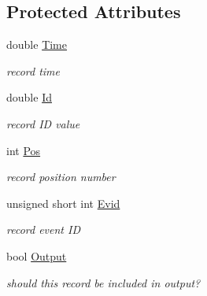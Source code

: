 \subsection*{Protected Attributes}
\begin{DoxyCompactItemize}
\item 
\mbox{\label{classdatarecord_a9c838bbc2f22e277ceb55481bf4b0bd9}} 
double \hyperlink{classdatarecord_a9c838bbc2f22e277ceb55481bf4b0bd9}{Time}
\begin{DoxyCompactList}\small\item\em record time \end{DoxyCompactList}\item 
\mbox{\label{classdatarecord_a59bc53cc283821c59a543e8351200d3d}} 
double \hyperlink{classdatarecord_a59bc53cc283821c59a543e8351200d3d}{Id}
\begin{DoxyCompactList}\small\item\em record ID value \end{DoxyCompactList}\item 
\mbox{\label{classdatarecord_a4b7abd0c9aaf418ed5a79d56d59c9733}} 
int \hyperlink{classdatarecord_a4b7abd0c9aaf418ed5a79d56d59c9733}{Pos}
\begin{DoxyCompactList}\small\item\em record position number \end{DoxyCompactList}\item 
\mbox{\label{classdatarecord_a96981b0026701da66e8b376d3a3fbd24}} 
unsigned short int \hyperlink{classdatarecord_a96981b0026701da66e8b376d3a3fbd24}{Evid}
\begin{DoxyCompactList}\small\item\em record event ID \end{DoxyCompactList}\item 
\mbox{\label{classdatarecord_a8d3f010ba2f0fcbb4d008867fdd84f36}} 
bool \hyperlink{classdatarecord_a8d3f010ba2f0fcbb4d008867fdd84f36}{Output}
\begin{DoxyCompactList}\small\item\em should this record be included in output? \end{DoxyCompactList}\item 
\mbox{\label{classdatarecord_a2e94c47f9bb5e6f3acb484c495f2a2d5}} 

\end{DoxyCompactItemize}

